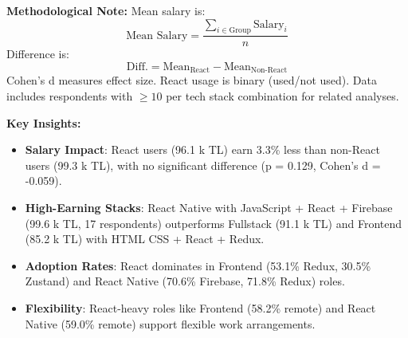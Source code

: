 \documentclass[12pt,a4paper]{article}
\begin{document}
\textbf{Methodological Note:}
Mean salary is:
\[
	\text{Mean Salary} = \frac{\sum_{i \in \text{Group}} \text{Salary}_i}{n}
\]
Difference is:
\[
	\text{Diff.} = \text{Mean}_{\text{React}} - \text{Mean}_{\text{Non-React}}
\]
Cohen’s d measures effect size. React usage is binary (used/not used). Data includes respondents with \(\geq 10\) per tech stack combination for related analyses.

\textbf{Key Insights:}
\begin{itemize}
	\item \textbf{Salary Impact}: React users (96.1 k TL) earn 3.3\% less than non-React users (99.3 k TL), with no significant difference (p = 0.129, Cohen’s d = -0.059).
	\item \textbf{High-Earning Stacks}: React Native with JavaScript + React + Firebase (99.6 k TL, 17 respondents) outperforms Fullstack (91.1 k TL) and Frontend (85.2 k TL) with HTML CSS + React + Redux.
	\item \textbf{Adoption Rates}: React dominates in Frontend (53.1\% Redux, 30.5\% Zustand) and React Native (70.6\% Firebase, 71.8\% Redux) roles.
	\item \textbf{Flexibility}: React-heavy roles like Frontend (58.2\% remote) and React Native (59.0\% remote) support flexible work arrangements.
\end{itemize}



\end{document}
